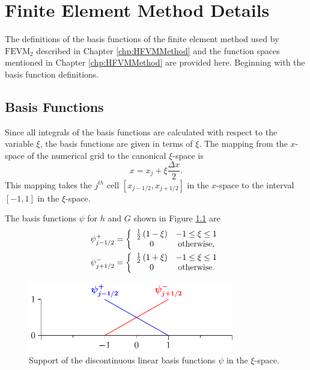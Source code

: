 \chapter{Finite Element Method Details}
\label{app:FEMIntegrals}
The definitions of the basis functions of the finite element method used by $\text{FEVM}_2$ described in Chapter \ref{chp:HFVMMethod} and the function spaces mentioned in Chapter \ref{chp:HFVMMethod} are provided here. Beginning with the basis function definitions.

\section{Basis Functions}
Since all integrals of the basis functions are calculated with respect to the variable $\xi$, the basis functions are given in terms of $\xi$. The mapping from the $x$-space of the numerical grid to the canonical $\xi$-space is
\begin{equation*}
x = x_j + \xi \frac{\Delta x}{2}.
\end{equation*}
This mapping takes the $j^{th}$ cell $\left[x_{j-1/2},x_{j+1/2}\right]$ in the $x$-space to the interval $\left[-1,1\right]$ in the $\xi$-space.

The basis functions $\psi$ for $h$ and $G$ shown in Figure \ref{fig:P1DiscBasisAPP} are
\begin{subequations}
	\label{eqn:App1:PsiDef}
\begin{align}
\psi^+_{j-1/2} &= \left\lbrace \begin{array}{c c}
\frac{1}{2}\left(1 - \xi\right) & -1 \le \xi \le 1\\
0 & \text{otherwise} ,
\end{array} \right.  \\
\psi^-_{j+1/2} &= \left\lbrace \begin{array}{c c}
\frac{1}{2}\left(1 + \xi\right) & -1 \le \xi \le 1\\
0 & \text{otherwise} .
\end{array} \right. 
\end{align}
\end{subequations}

\begin{figure}
	\centering
	\includegraphics[width=0.8\textwidth]{./app1/Figures/P1.pdf}
	\caption{Support of the discontinuous linear basis functions $\psi$ in the $\xi$-space.}
	\label{fig:P1DiscBasisAPP}
\end{figure}

